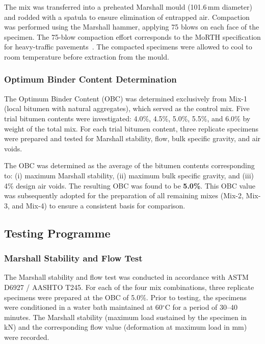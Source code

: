 \documentclass[12pt,a4paper]{article}
\begin{document}
The mix was transferred into a preheated Marshall mould (101.6\,mm diameter) and rodded with a spatula to ensure elimination of entrapped air. Compaction was performed using the Marshall hammer, applying 75 blows on each face of the specimen. The 75-blow compaction effort corresponds to the MoRTH specification for heavy-traffic pavements~\cite{rajkumar2018experimental}. The compacted specimens were allowed to cool to room temperature before extraction from the mould.

\subsubsection{Optimum Binder Content Determination}

The Optimum Binder Content (OBC) was determined exclusively from Mix-1 (local bitumen with natural aggregates), which served as the control mix. Five trial bitumen contents were investigated: 4.0\%, 4.5\%, 5.0\%, 5.5\%, and 6.0\% by weight of the total mix. For each trial bitumen content, three replicate specimens were prepared and tested for Marshall stability, flow, bulk specific gravity, and air voids.

The OBC was determined as the average of the bitumen contents corresponding to: (i) maximum Marshall stability, (ii) maximum bulk specific gravity, and (iii) 4\% design air voids. The resulting OBC was found to be \textbf{5.0\%}. This OBC value was subsequently adopted for the preparation of all remaining mixes (Mix-2, Mix-3, and Mix-4) to ensure a consistent basis for comparison.

\subsection{Testing Programme}

\subsubsection{Marshall Stability and Flow Test}

The Marshall stability and flow test was conducted in accordance with ASTM D6927 / AASHTO T245. For each of the four mix combinations, three replicate specimens were prepared at the OBC of 5.0\%. Prior to testing, the specimens were conditioned in a water bath maintained at 60$^{\circ}$C for a period of 30--40 minutes. The Marshall stability (maximum load sustained by the specimen in kN) and the corresponding flow value (deformation at maximum load in mm) were recorded.
\end{document}

